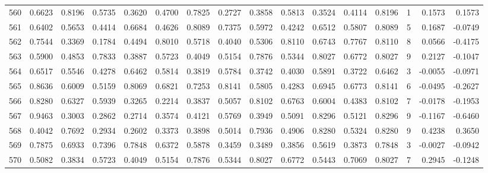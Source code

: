 \begin{tabular}{lrrrrrrrrrrrrrrr}
560 &      0.6623 &  0.8196 &  0.5735 &  0.3620 &  0.4700 &  0.7825 &  0.2727 &  0.3858 &  0.5813 &  0.3524 &   0.4114 &     0.8196 &      1 &                    0.1573 &                     0.1573 \\
561 &      0.6402 &  0.5653 &  0.4414 &  0.6684 &  0.4626 &  0.8089 &  0.7375 &  0.5972 &  0.4242 &  0.6512 &   0.5807 &     0.8089 &      5 &                    0.1687 &                    -0.0749 \\
562 &      0.7544 &  0.3369 &  0.1784 &  0.4494 &  0.8010 &  0.5718 &  0.4040 &  0.5306 &  0.8110 &  0.6743 &   0.7767 &     0.8110 &      8 &                    0.0566 &                    -0.4175 \\
563 &      0.5900 &  0.4853 &  0.7833 &  0.3887 &  0.5723 &  0.4049 &  0.5154 &  0.7876 &  0.5344 &  0.8027 &   0.6772 &     0.8027 &      9 &                    0.2127 &                    -0.1047 \\
564 &      0.6517 &  0.5546 &  0.4278 &  0.6462 &  0.5814 &  0.3819 &  0.5784 &  0.3742 &  0.4030 &  0.5891 &   0.3722 &     0.6462 &      3 &                   -0.0055 &                    -0.0971 \\
565 &      0.8636 &  0.6009 &  0.5159 &  0.8069 &  0.6821 &  0.7253 &  0.8141 &  0.5805 &  0.4283 &  0.6945 &   0.6773 &     0.8141 &      6 &                   -0.0495 &                    -0.2627 \\
566 &      0.8280 &  0.6327 &  0.5939 &  0.3265 &  0.2214 &  0.3837 &  0.5057 &  0.8102 &  0.6763 &  0.6004 &   0.4383 &     0.8102 &      7 &                   -0.0178 &                    -0.1953 \\
567 &      0.9463 &  0.3003 &  0.2862 &  0.2714 &  0.3574 &  0.4121 &  0.5769 &  0.3949 &  0.5091 &  0.8296 &   0.5121 &     0.8296 &      9 &                   -0.1167 &                    -0.6460 \\
568 &      0.4042 &  0.7692 &  0.2934 &  0.2602 &  0.3373 &  0.3898 &  0.5014 &  0.7936 &  0.4906 &  0.8280 &   0.5324 &     0.8280 &      9 &                    0.4238 &                     0.3650 \\
569 &      0.7875 &  0.6933 &  0.7396 &  0.7848 &  0.6372 &  0.5878 &  0.3459 &  0.3489 &  0.3856 &  0.5619 &   0.3873 &     0.7848 &      3 &                   -0.0027 &                    -0.0942 \\
570 &      0.5082 &  0.3834 &  0.5723 &  0.4049 &  0.5154 &  0.7876 &  0.5344 &  0.8027 &  0.6772 &  0.5443 &   0.7069 &     0.8027 &      7 &                    0.2945 &                    -0.1248 \\

\end{tabular}

